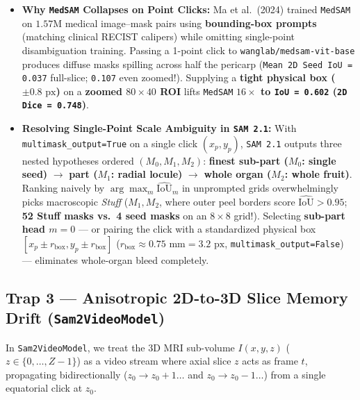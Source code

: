 \documentclass[10.5pt,a4paper]{article}
\begin{document}
\begin{itemize}
    \item \textbf{Why \texttt{MedSAM} Collapses on Point Clicks:} Ma et al.\ (2024) trained \texttt{MedSAM} on $1.57\text{M}$ medical image--mask pairs using \textbf{bounding-box prompts} (matching clinical RECIST calipers) while omitting single-point disambiguation training. Passing a 1-point click to \texttt{wanglab/medsam-vit-base} produces diffuse masks spilling across half the pericarp (\texttt{Mean 2D Seed IoU = 0.037} full-slice; \texttt{0.107} even zoomed!). Supplying a \textbf{tight physical box ($\pm 0.8\text{ px}$)} on a \textbf{zoomed $80 \times 40$ ROI} lifts \texttt{MedSAM} \textbf{$16\times$ to \texttt{IoU = 0.602} (\texttt{2D Dice = 0.748})}.
    \item \textbf{Resolving Single-Point Scale Ambiguity in \texttt{SAM 2.1}:} With \texttt{multimask\_output=True} on a single click $(x_p, y_p)$, \texttt{SAM 2.1} outputs three nested hypotheses ordered $(M_0, M_1, M_2)$: \textbf{finest sub-part ($M_0$: single seed)} $\to$ \textbf{part ($M_1$: radial locule)} $\to$ \textbf{whole organ ($M_2$: whole fruit)}. Ranking naively by $\arg\max_m \widehat{\text{IoU}}_m$ in unprompted grids overwhelmingly picks macroscopic \emph{Stuff} ($M_1, M_2$, where outer peel borders score $\widehat{\text{IoU}} > 0.95$; \textbf{52 Stuff masks vs.\ 4 seed masks} on an $8\times 8$ grid!). Selecting \textbf{sub-part head $m = 0$} --- or pairing the click with a standardized physical box $[x_p \pm r_{\text{box}}, y_p \pm r_{\text{box}}]$ ($r_{\text{box}} \approx 0.75\text{ mm} = 3.2\text{ px}$, \texttt{multimask\_output=False}) --- eliminates whole-organ bleed completely.
\end{itemize}

\subsection{Trap 3 --- Anisotropic 2D-to-3D Slice Memory Drift (\texttt{Sam2VideoModel})}

In \texttt{Sam2VideoModel}, we treat the 3D MRI sub-volume $I(x, y, z)$ ($z \in \{0, \dots, Z-1\}$) as a video stream where axial slice $z$ acts as frame $t$, propagating bidirectionally ($z_0 \to z_0 + 1 \dots$ and $z_0 \to z_0 - 1 \dots$) from a single equatorial click at $z_0$.
\end{document}

